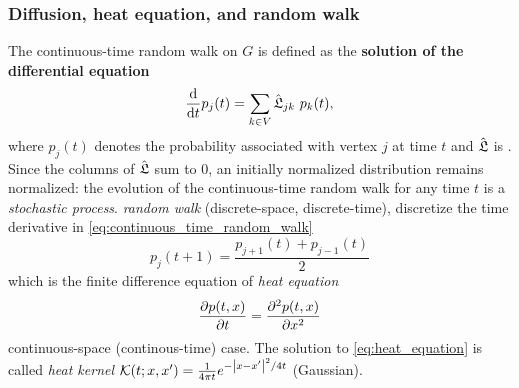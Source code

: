 \subsubsection{Diffusion, heat equation, and random walk}
The continuous-time random walk on $G$ is defined as the \textbf{solution of the differential equation}
\begin{equation}
	\dv{t} p_j(t)
	=
	\sum_{k\in V} \hat{\mathfrak{L}}_{jk} \ p_k(t),
	\label{eq:continuous_time_random_walk}
\end{equation}
where $p_j(t)$ denotes the probability associated with vertex $j$ at time $t$
and $\hat{\mathfrak{L}}$ is .
Since the columns of $\hat{\mathfrak{L}}$ sum to 0,
an initially normalized distribution remains normalized:
the evolution of the continuous-time random walk for any time $t$ is a \emph{stochastic process}.
\emph{random walk} (discrete-space, discrete-time), 
discretize the time derivative in \cref{eq:continuous_time_random_walk}
\begin{equation}
	p_j(t+1) = \frac{p_{j+1}(t) + p_{j-1}(t)}{2} 
\end{equation}
which is the finite difference equation of \emph{heat equation} 
\begin{equation}
	\pdv{p(t,x)}{t} = \pdv{ ^2 p(t,x)}{x^2}
	\label{eq:heat_equation}
\end{equation}
continuous-space (continous-time) case.
The solution to \cref{eq:heat_equation} is called \emph{heat kernel} $\mathcal{K}(t;x,x')=\frac{1}{4\pi t} e^{-\abs{x-x'}^2/4t}$ (Gaussian).

